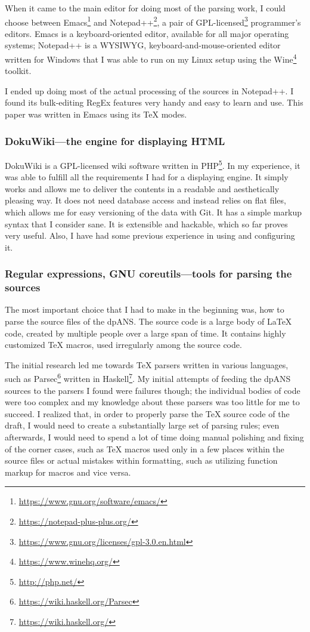 When it came to the main editor for doing most of the parsing work, I could choose between Emacs\footnote{\url{https://www.gnu.org/software/emacs/}} and Note\-pad++\footnote{\url{https://notepad-plus-plus.org/}}, a pair of GPL-licensed\footnote{\url{https://www.gnu.org/licenses/gpl-3.0.en.html}} programmer's editors. Emacs is a keyboard-oriented editor, available for all major operating systems; Notepad++ is a WYSIWYG, keyboard-and-mouse-oriented editor written for Windows that I was able to run on my Linux setup using the Wine\footnote{\url{https://www.winehq.org/}} toolkit.

I ended up doing most of the actual processing of the sources in Notepad++. I found its bulk-editing RegEx features very handy and easy to learn and use. This paper was written in Emacs using its TeX modes.

\subsubsection{DokuWiki---the engine for displaying HTML}

DokuWiki is a GPL-licensed wiki software written in PHP\footnote{\url{http://php.net/}}. In my experience, it was able to fulfill all the requirements I had for a displaying engine. It simply works and allows me to deliver the contents in a readable and aesthetically pleasing way. It does not need database access and instead relies on flat files, which allows me for easy versioning of the data with Git. It has a simple markup syntax that I consider sane. It is extensible and hackable, which so far proves very useful. Also, I have had some previous experience in using and configuring it.

\subsubsection{Regular expressions, GNU coreutils---tools for parsing the sources}

The most important choice that I had to make in the beginning was, how to parse the source files of the dpANS. The source code is a large body of \LaTeX{} code, created by multiple people over a large span of time. It contains highly customized \TeX{} macros, used irregularly among the source code.

The initial research led me towards \TeX{} parsers written in various languages, such as Parsec\footnote{\url{https://wiki.haskell.org/Parsec}} written in Haskell\footnote{\url{https://wiki.haskell.org/}}. My initial attempts of feeding the dpANS sources to the parsers I found were failures though; the individual bodies of code were too complex and my knowledge about these parsers was too little for me to succeed. I realized that, in order to properly parse the \TeX{} source code of the draft, I would need to create a substantially large set of parsing rules; even afterwards, I would need to spend a lot of time doing manual polishing and fixing of the corner cases, such as \TeX{} macros used only in a few places within the source files or actual mistakes within formatting, such as utilizing function markup for macros and vice versa.


